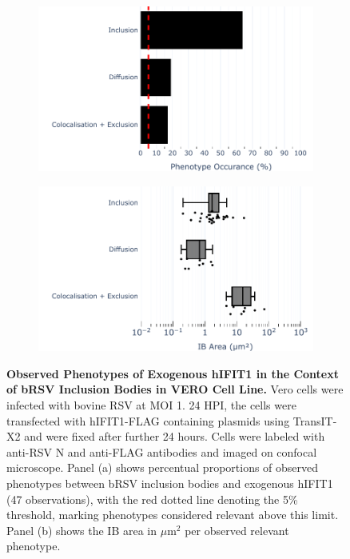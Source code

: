 \begin{figure}
    \begin{subfigure}{0.495\textwidth}
        \caption{}
        \includegraphics[width=1\linewidth]{09. Chapter 4/Figs/02. Overexpression/01. IFIT1/04. bar_i1_brsv.pdf} 
    \end{subfigure}
    \begin{subfigure}{0.495\textwidth}
        \caption{}
        \includegraphics[width=1\linewidth]{09. Chapter 4/Figs/02. Overexpression/01. IFIT1/05. box_i1_brsv.pdf}
    \end{subfigure}
    \caption[Observed Phenotypes of Exogenous hIFIT1 in the Context of bRSV Inclusion Bodies in VERO Cell Line.]{\textbf{Observed Phenotypes of Exogenous hIFIT1 in the Context of bRSV Inclusion Bodies in VERO Cell Line.} Vero cells were infected with bovine RSV at MOI 1. 24 HPI, the cells were transfected with hIFIT1-FLAG containing plasmids using TransIT-X2 and were fixed after further 24 hours. Cells were labeled with anti-RSV N and anti-FLAG antibodies and imaged on confocal microscope. Panel (a) shows percentual proportions of observed phenotypes between bRSV inclusion bodies and exogenous hIFIT1 (47 observations), with the red dotted line denoting the 5\% threshold, marking phenotypes considered relevant above this limit. Panel (b) shows the IB area in \(\mu \mbox{m}^2\) per observed relevant phenotype.}
    \label{fig:Observed Phenotypes of Exogenous hIFIT1 in the Context of bRSV Inclusion Bodies in VERO Cell Line}
\end{figure}

